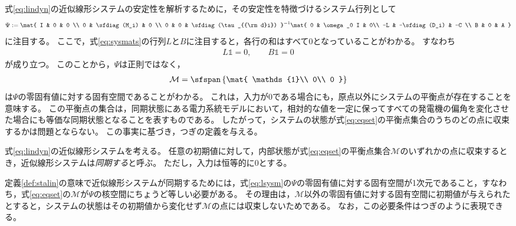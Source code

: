 \documentclass[tombow,dvipdfmx]{corona-a5}
\begin{document}
式\ref{eq:lindyn}の近似線形システムの安定性を解析するために，その安定性を特徴づけるシステム行列として
\begin{align}\label{eq:lsysm}
\Psi :=
\mat{
I & 0 & 0 \\
0 & \sfdiag(M_i) & 0 \\
0 & 0 & \sfdiag(\tau_{{\rm d}i}) 
}^{-1}
\mat{
0 & \omega_0 I & 0\\
 -L & -\sfdiag(D_i) & -C \\
 B & 0 & A
 }
\end{align}
に注目する。
ここで，式\ref{eq:sysmats}の行列$L$と$B$に注目すると，各行の和はすべて0となっていることがわかる。
すなわち
\begin{align}\label{eq:LBker}
L  \mathds{1} = 0
,\qquad
 B  \mathds{1} =0
\end{align}
が成り立つ。
このことから，$\Psi$は正則ではなく，
\begin{align}\label{eq:eqset}
\mathcal{M} =
 \sfspan\left\{
 \mat{
 \mathds{1}\\
 0\\
 0
 }
 \right\}
\end{align}
は$\Psi$の零固有値に対する固有空間であることがわかる。
これは，入力が0である場合にも，原点以外にシステムの平衡点が存在することを意味する。
この平衡点の集合は，同期状態にある電力系統モデルにおいて，相対的な値を一定に保ってすべての発電機の偏角を変化させた場合にも等価な同期状態となることを表すものである。
したがって，システムの状態が式\ref{eq:eqset}の平衡点集合のうちのどの点に収束するかは問題とならない。
この事実に基づき，つぎの定義を与える。

\begin{定義}[近似線形システムの同期]
\label{def:stalin}
式\ref{eq:lindyn}の近似線形システムを考える。
任意の初期値に対して，内部状態が式\ref{eq:eqset}の平衡点集合$\mathcal{M}$のいずれかの点に収束するとき，近似線形システムは\emph{同期する}と呼ぶ。
ただし，入力は恒等的に0とする。
\end{定義}

定義\ref{def:stalin}の意味で近似線形システムが同期するためには，式\ref{eq:lsysm}の$\Psi$の零固有値に対する固有空間が1次元であること，すなわち，式\ref{eq:eqset}の$\mathcal{M}$が$\Psi$の核空間にちょうど等しい必要がある。
その理由は，$\mathcal{M}$以外の零固有値に対する固有空間に初期値が与えられたとすると，システムの状態はその初期値から変化せず$\mathcal{M}$の点には収束しないためである。
なお，この必要条件はつぎのように表現できる。
\end{document}
